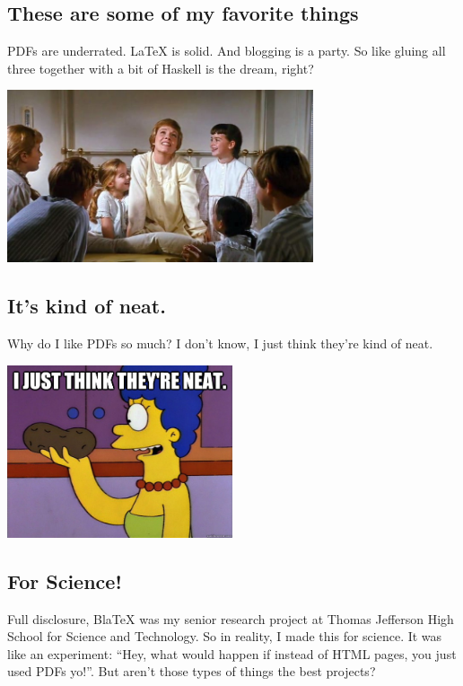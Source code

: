 \documentclass[12pt]{article}
\begin{document}
  \subsection{These are some of my favorite things}  

  PDFs are underrated. LaTeX is solid. And blogging is a party. So like gluing all three together with a bit of Haskell is the dream, right?

  \begin{center}
  \includegraphics[height=2in]{favorite_things}
  \end{center}


  \subsection{It's kind of neat.}

  Why do I like PDFs so much? I don't know, I just think they're kind of neat. 
  \begin{center}
  \includegraphics[height=2in]{neat}
  \end{center}

  \subsection{For Science!}

  Full disclosure, BlaTeX was my senior research project at Thomas Jefferson High School for Science and Technology. So in reality, I made this for science. It was like an experiment: ``Hey, what would happen if instead of HTML pages, you just used PDFs yo!''. But aren't those types of things the best projects?
\end{document}
